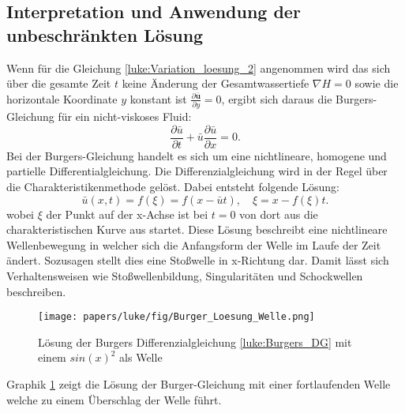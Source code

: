 \subsection{Interpretation und Anwendung der unbeschränkten Lösung}
Wenn für die Gleichung \eqref{luke:Variation_loesung_2} angenommen wird das sich über die gesamte Zeit $t$ keine Änderung der Gesamtwassertiefe $ \nabla H = 0 $ sowie die horizontale Koordinate $y$ konstant ist $\frac{\partial \bar{\bm{u}}}{\partial y} = 0$, ergibt sich daraus die Burgers-Gleichung für ein nicht-viskoses Fluid:
\begin{equation}
	\frac{\partial \bar{u}}{\partial t} + \bar{u} \frac{\partial \bar{u}}{\partial x} = 0.
	\label{luke:Burgers_DG}
\end{equation}
Bei der Burgers-Gleichung handelt es sich um eine nichtlineare, homogene und partielle Differentialgleichung.
Die Differenzialgleichung wird in der Regel über die Charakteristikenmethode gelöst. 
Dabei entsteht folgende Lösung:
\[
\bar{u}(x,t) = f(\xi) = f(x-\bar{u}t),\quad \xi = x-f(\xi)t.
\]
wobei $\xi$ der Punkt auf der x-Achse ist bei $t = 0$ von dort aus die charakteristischen Kurve aus startet.
Diese Lösung beschreibt eine nichtlineare Wellenbewegung in welcher sich die Anfangsform der Welle im Laufe der Zeit ändert.
Sozusagen stellt dies eine Stoßwelle in x-Richtung dar.
Damit lässt sich Verhaltensweisen wie Stoßwellenbildung, Singularitäten und Schockwellen beschreiben.
\begin{figure}
	\texttt{[image: papers/luke/fig/Burger\_Loesung\_Welle.png]}
	\caption{Lösung der Burgers Differenzialgleichung \eqref{luke:Burgers_DG} mit einem $sin(x)^2$ als Welle
		\label{luke:fig:Loesung_Burgers}}
\end{figure}
Graphik \ref{luke:fig:Loesung_Burgers} zeigt die Lösung der Burger-Gleichung mit einer fortlaufenden Welle welche zu einem Überschlag der Welle führt.

